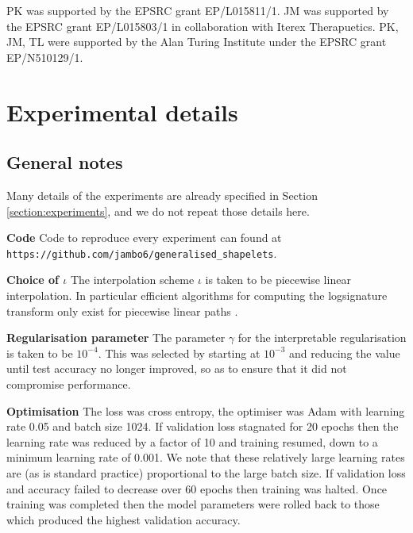 \documentclass{article}
\theoremstyle{plain}
\theoremstyle{definition}
\newcommand{\boldheading}[1]{

\textbf{#1}\quad}
\begin{document}
	
	\begin{ack}
	PK was supported by the EPSRC grant EP/L015811/1. JM was supported by the EPSRC grant EP/L015803/1 in collaboration with Iterex Therapuetics. PK, JM, TL were supported by the Alan Turing Institute under the EPSRC grant EP/N510129/1.
	\end{ack}
	
	\small
	
	 
	
	\normalsize
	\newpage
	\appendix
	
	\section{Experimental details}\label{appendix:experimental}
	\subsection{General notes}
	Many details of the experiments are already specified in Section \ref{section:experiments}, and we do not repeat those details here.
	
	\boldheading{Code} Code to reproduce every experiment can found at \texttt{https://github.com/jambo6/generalised\_shapelets}.
	
	\boldheading{Choice of $\iota$} The interpolation scheme $\iota$ is taken to be piecewise linear interpolation. In particular efficient algorithms for computing the logsignature transform only exist for piecewise linear paths \cite{signatory}.
	
	\boldheading{Regularisation parameter} The parameter $\gamma$ for the interpretable regularisation is taken to be $10^{-4}$. This was selected by starting at $10^{-3}$ and reducing the value until test accuracy no longer improved, so as to ensure that it did not compromise performance.
	
	\boldheading{Optimisation} %
The loss was cross entropy, the optimiser was Adam \cite{kingma2015} with learning rate 0.05 and batch size 1024. If validation loss stagnated for 20 epochs then the learning rate was reduced by a factor of 10 and training resumed, down to a minimum learning rate of 0.001. We note that these relatively large learning rates are (as is standard practice) proportional to the large batch size. If validation loss and accuracy failed to decrease over 60 epochs then training was halted. Once training was completed then the model parameters were rolled back to those which produced the highest validation accuracy.
	
\end{document}
